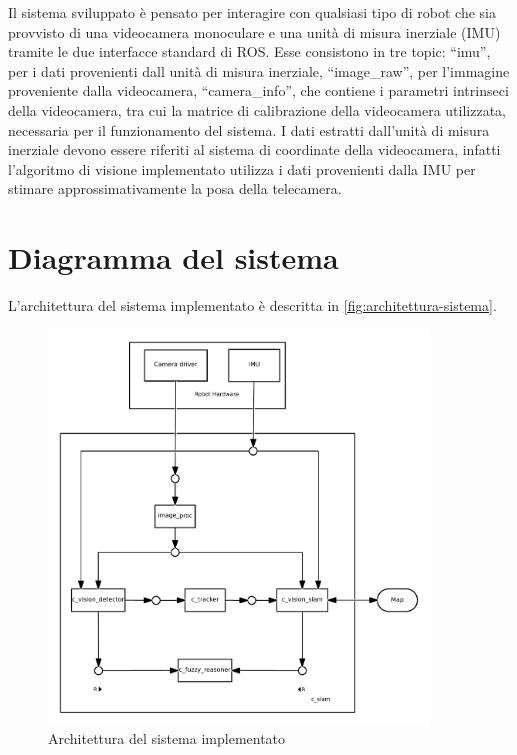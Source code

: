 Il sistema sviluppato è pensato per interagire con qualsiasi tipo di robot che sia provvisto di una videocamera monoculare e una unità di misura inerziale (IMU) tramite le due interfacce standard di ROS.
Esse consistono in tre topic: ``imu'', per i dati provenienti dall unità di misura inerziale, ``image\_raw'', per l'immagine proveniente dalla videocamera, ``camera\_info'', che contiene i parametri intrinseci della videocamera, tra cui la matrice di calibrazione della videocamera utilizzata, necessaria per il funzionamento del sistema.
I dati estratti dall'unità di misura inerziale devono essere riferiti al sistema di coordinate della videocamera, infatti l'algoritmo di visione implementato utilizza i dati provenienti dalla IMU per stimare approssimativamente la posa della telecamera.

\section{Diagramma del sistema}

L'architettura del sistema implementato è descritta in \autoref{fig:architettura-sistema}. \\
\begin{figure}[here]
  \includegraphics[width=0.9\textwidth]{diagrammi/Sistema}
  \caption{Architettura del sistema implementato}
  \label{fig:architettura-sistema}
\end{figure}


